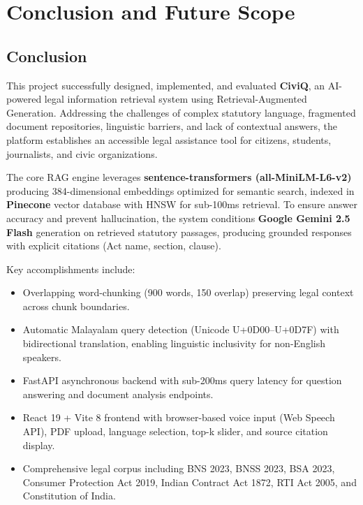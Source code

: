 \documentclass[12pt,a4paper]{report}
\begin{document}
\chapter{Conclusion and Future Scope}

\section{Conclusion}
This project successfully designed, implemented, and evaluated \textbf{CiviQ}, an AI-powered legal information retrieval system using Retrieval-Augmented Generation. Addressing the challenges of complex statutory language, fragmented document repositories, linguistic barriers, and lack of contextual answers, the platform establishes an accessible legal assistance tool for citizens, students, journalists, and civic organizations.

The core RAG engine leverages \textbf{sentence-transformers (all-MiniLM-L6-v2)} producing 384-dimensional embeddings optimized for semantic search, indexed in \textbf{Pinecone} vector database with HNSW for sub-100ms retrieval. To ensure answer accuracy and prevent hallucination, the system conditions \textbf{Google Gemini 2.5 Flash} generation on retrieved statutory passages, producing grounded responses with explicit citations (Act name, section, clause).

Key accomplishments include:
\begin{itemize}
    \item Overlapping word-chunking (900 words, 150 overlap) preserving legal context across chunk boundaries.
    \item Automatic Malayalam query detection (Unicode U+0D00–U+0D7F) with bidirectional translation, enabling linguistic inclusivity for non-English speakers.
    \item FastAPI asynchronous backend with sub-200ms query latency for question answering and document analysis endpoints.
    \item React 19 + Vite 8 frontend with browser-based voice input (Web Speech API), PDF upload, language selection, top-k slider, and source citation display.
    \item Comprehensive legal corpus including BNS 2023, BNSS 2023, BSA 2023, Consumer Protection Act 2019, Indian Contract Act 1872, RTI Act 2005, and Constitution of India.
\end{itemize}
\end{document}
